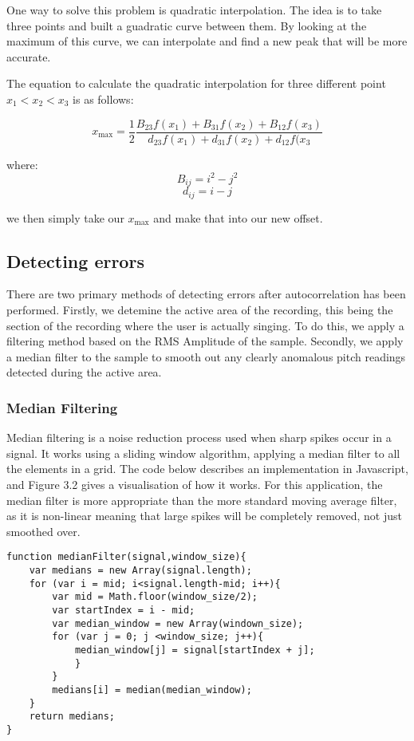 One way to solve this problem is quadratic interpolation\cite{quadraticInterpolation}. The idea is to take three points and built a guadratic curve between them. By looking at the maximum of this curve, we can interpolate and find a new peak that will be more accurate.

The equation to calculate the quadratic interpolation for three different point \(x_1<x_2<x_3\) is as follows:

\[x_\text{max} =\frac{1}{2} \frac{B_{23}f(x_1) + B_{31}f(x_2)+ B_{12}f(x_3)}
{d_{23}f(x_1) + d_{31}f(x_2) + d_{12}f(x_3} \]

where:
\[B_{ij} = i^2 - j^2\]
\[d_{ij} = i - j\]

we then simply take our \(x_\text{max}\) and make that into our new offset.  


\subsection{Detecting errors}
There are two primary methods of detecting errors after autocorrelation has been performed.
Firstly, we detemine the active area of the recording, this being the section of the recording where the user is actually singing. To do this, we apply a filtering method based on the RMS Amplitude of the sample.
Secondly, we apply a median filter to the sample to smooth out any clearly anomalous pitch readings detected during the active area.
\subsubsection{Median Filtering}
Median filtering is a noise reduction process used when sharp spikes occur in a signal. It works using a sliding window algorithm, applying a median filter to all the elements in a grid. The code below describes an implementation in Javascript, and Figure 3.2 gives a visualisation of how it works. 
For this application, the median filter is more appropriate than the more standard moving average filter, as it is non-linear meaning that large spikes will be completely removed, not just smoothed over. 
\begin{lstlisting}
function medianFilter(signal,window_size){
    var medians = new Array(signal.length);
    for (var i = mid; i<signal.length-mid; i++){
        var mid = Math.floor(window_size/2);
        var startIndex = i - mid;
        var median_window = new Array(windown_size);
        for (var j = 0; j <window_size; j++){
            median_window[j] = signal[startIndex + j];
            }
        }
        medians[i] = median(median_window);
    }
    return medians;
}
\end{lstlisting}

